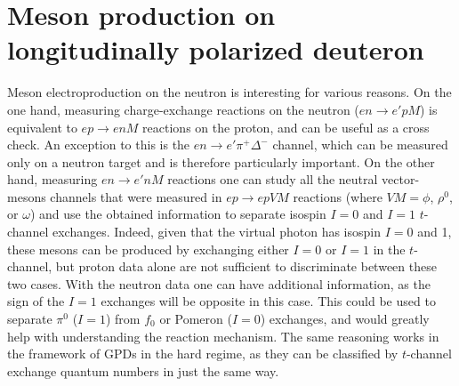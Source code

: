 \documentclass[a4paper,12pt]{report}
\begin{document}
\section{Meson production on longitudinally polarized deuteron}
Meson electroproduction on the neutron is interesting for various reasons. 
On the one hand, measuring charge-exchange reactions on the neutron ($en \to e'pM$) is equivalent to $ep \to enM$ reactions on the proton, and can be useful as a cross check. An exception to this is the $e n\to e'\pi^+ \Delta^-$ channel, which can be measured only on a neutron target and is therefore particularly important. 
On the other hand, measuring $en \to e'nM$ reactions one can study all the neutral vector-mesons channels that were measured in $ep \to ep VM$ reactions (where $VM=\phi$, $\rho^0$, or $\omega$) and use the obtained information to separate isospin $I = 0$ and $I = 1$ $t$-channel exchanges. Indeed, given that the virtual photon has isospin $I = 0$ and 1, these mesons can be produced by exchanging either $I = 0$ or $I = 1$ in the $t$-channel, but proton data alone are not sufficient to discriminate between these two cases. With the neutron data one can have additional information, as the sign of the $I = 1$ exchanges will be opposite in this case. This could be used to separate  $\pi^0$ ($I = 1$) from  $f_0$ or Pomeron ($I = 0$) exchanges, and would greatly help with understanding the reaction mechanism. The same reasoning works in the framework of GPDs in the hard regime, as they can be classified by $t$-channel exchange quantum numbers in just the same way. 
\end{document}
